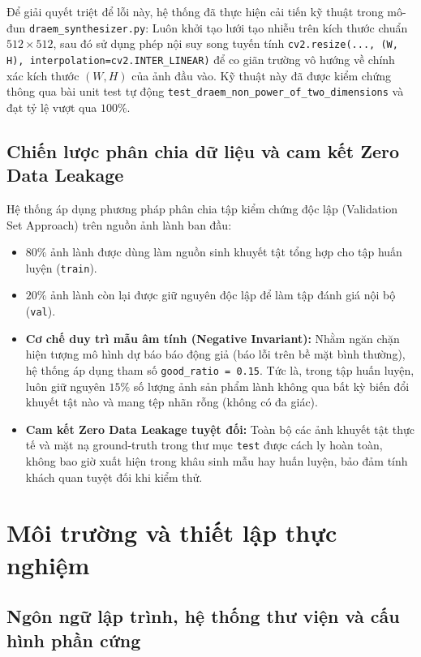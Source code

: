 Để giải quyết triệt để lỗi này, hệ thống đã thực hiện cải tiến kỹ thuật trong mô-đun \texttt{draem\_synthesizer.py}: Luôn khởi tạo lưới tạo nhiễu trên kích thước chuẩn $512 \times 512$, sau đó sử dụng phép nội suy song tuyến tính \texttt{cv2.resize(..., (W, H), interpolation=cv2.INTER\_LINEAR)} để co giãn trường vô hướng về chính xác kích thước $(W, H)$ của ảnh đầu vào. Kỹ thuật này đã được kiểm chứng thông qua bài unit test tự động \texttt{test\_draem\_non\_power\_of\_two\_dimensions} và đạt tỷ lệ vượt qua $100\%$.

\subsection{Chiến lược phân chia dữ liệu và cam kết Zero Data Leakage}

Hệ thống áp dụng phương pháp phân chia tập kiểm chứng độc lập (Validation Set Approach) trên nguồn ảnh lành ban đầu:
\begin{itemize}
    \item $80\%$ ảnh lành được dùng làm nguồn sinh khuyết tật tổng hợp cho tập huấn luyện (\texttt{train}).
    \item $20\%$ ảnh lành còn lại được giữ nguyên độc lập để làm tập đánh giá nội bộ (\texttt{val}).
    \item \textbf{Cơ chế duy trì mẫu âm tính (Negative Invariant):} Nhằm ngăn chặn hiện tượng mô hình dự báo báo động giả (báo lỗi trên bề mặt bình thường), hệ thống áp dụng tham số \texttt{good\_ratio = 0.15}. Tức là, trong tập huấn luyện, luôn giữ nguyên $15\%$ số lượng ảnh sản phẩm lành không qua bất kỳ biến đổi khuyết tật nào và mang tệp nhãn rỗng (không có đa giác).
    \item \textbf{Cam kết Zero Data Leakage tuyệt đối:} Toàn bộ các ảnh khuyết tật thực tế và mặt nạ ground-truth trong thư mục \texttt{test} được cách ly hoàn toàn, không bao giờ xuất hiện trong khâu sinh mẫu hay huấn luyện, bảo đảm tính khách quan tuyệt đối khi kiểm thử.
\end{itemize}

\section{Môi trường và thiết lập thực nghiệm}

\subsection{Ngôn ngữ lập trình, hệ thống thư viện và cấu hình phần cứng}

